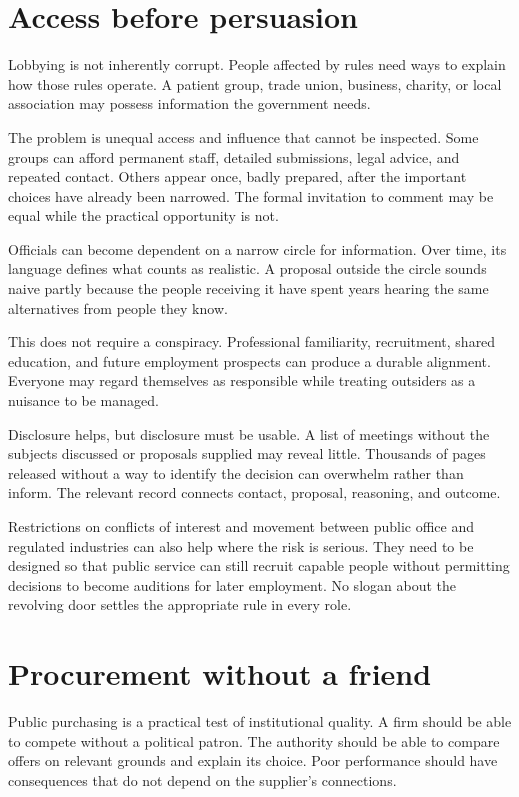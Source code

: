\documentclass[12pt,a4paper]{book}
\begin{document}
\section*{Access before persuasion}

Lobbying is not inherently corrupt. People affected by rules need ways to explain how those rules operate. A patient group, trade union, business, charity, or local association may possess information the government needs.

The problem is unequal access and influence that cannot be inspected. Some groups can afford permanent staff, detailed submissions, legal advice, and repeated contact. Others appear once, badly prepared, after the important choices have already been narrowed. The formal invitation to comment may be equal while the practical opportunity is not.

Officials can become dependent on a narrow circle for information. Over time, its language defines what counts as realistic. A proposal outside the circle sounds naive partly because the people receiving it have spent years hearing the same alternatives from people they know.

This does not require a conspiracy. Professional familiarity, recruitment, shared education, and future employment prospects can produce a durable alignment. Everyone may regard themselves as responsible while treating outsiders as a nuisance to be managed.

Disclosure helps, but disclosure must be usable. A list of meetings without the subjects discussed or proposals supplied may reveal little. Thousands of pages released without a way to identify the decision can overwhelm rather than inform. The relevant record connects contact, proposal, reasoning, and outcome.

Restrictions on conflicts of interest and movement between public office and regulated industries can also help where the risk is serious. They need to be designed so that public service can still recruit capable people without permitting decisions to become auditions for later employment. No slogan about the revolving door settles the appropriate rule in every role.

\section*{Procurement without a friend}

Public purchasing is a practical test of institutional quality. A firm should be able to compete without a political patron. The authority should be able to compare offers on relevant grounds and explain its choice. Poor performance should have consequences that do not depend on the supplier's connections.
\end{document}
